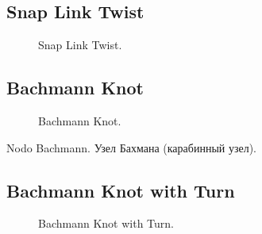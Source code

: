 \subsection{Snap Link Twist}

\begin{figure}[H]\centering
	\begin{minipage}{1\linewidth}
		\begin{center}
			\tcbox[enhanced jigsaw,colframe=black,opacityframe=0.5,opacityback=0.5]
			{\centering{}}
		\end{center}
	\end{minipage}
\caption{Snap Link Twist.}
\label{ris:Snap_Link_Twist}
\end{figure}

\subsection{Bachmann Knot}

\begin{figure}[H]\centering
	\begin{minipage}{1\linewidth}
		\begin{center}
			\tcbox[enhanced jigsaw,colframe=black,opacityframe=0.5,opacityback=0.5]
			{\centering{}}
		\end{center}
	\end{minipage}
\caption{Bachmann Knot.}
\label{ris:Bachmann_Knot}
\end{figure}

Nodo Bachmann. Узел Бахмана (карабинный узел).

\subsection{Bachmann Knot with Turn}

\begin{figure}[H]\centering
	\begin{minipage}{1\linewidth}
		\begin{center}
			\tcbox[enhanced jigsaw,colframe=black,opacityframe=0.5,opacityback=0.5]
			{\centering{}}
		\end{center}
	\end{minipage}
\caption{Bachmann Knot with Turn.}
\label{ris:Bachmann_Knot_with_Turn}
\end{figure}

